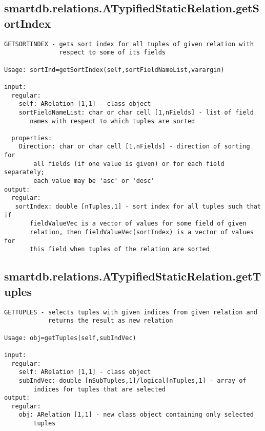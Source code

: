 \subsection{\texorpdfstring{smartdb.relations.ATypifiedStaticRelation.getSortIndex}{getSortIndex}}\label{method:smartdb.relations.ATypifiedStaticRelation.getSortIndex}
\begin{verbatim}
GETSORTINDEX - gets sort index for all tuples of given relation with
               respect to some of its fields

Usage: sortInd=getSortIndex(self,sortFieldNameList,varargin)

input:
  regular:
    self: ARelation [1,1] - class object
    sortFieldNameList: char or char cell [1,nFields] - list of field
       names with respect to which tuples are sorted

  properties:
    Direction: char or char cell [1,nFields] - direction of sorting for
        all fields (if one value is given) or for each field separately;
        each value may be 'asc' or 'desc'
output:
  regular:
   sortIndex: double [nTuples,1] - sort index for all tuples such that if
       fieldValueVec is a vector of values for some field of given
       relation, then fieldValueVec(sortIndex) is a vector of values for
       this field when tuples of the relation are sorted
\end{verbatim}
\subsection{\texorpdfstring{smartdb.relations.ATypifiedStaticRelation.getTuples}{getTuples}}\label{method:smartdb.relations.ATypifiedStaticRelation.getTuples}
\begin{verbatim}
GETTUPLES - selects tuples with given indices from given relation and
            returns the result as new relation

Usage: obj=getTuples(self,subIndVec)

input:
  regular:
    self: ARelation [1,1] - class object
    subIndVec: double [nSubTuples,1]/logical[nTuples,1] - array of
        indices for tuples that are selected
output:
  regular:
    obj: ARelation [1,1] - new class object containing only selected
        tuples
\end{verbatim}
